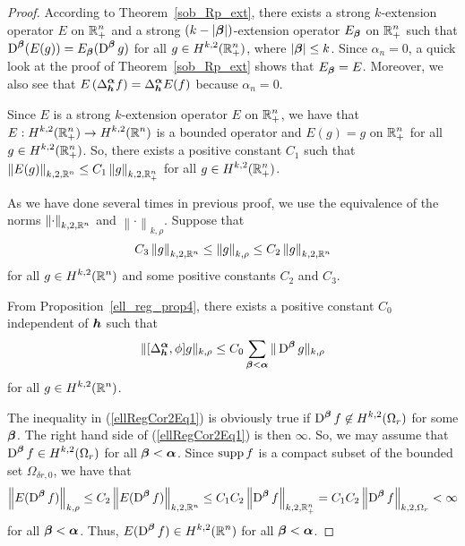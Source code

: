 \begin{proof}
According to Theorem~\ref{sob_Rp_ext}, there exists a strong
$k$-extension operator $E$ on $\displaystyle \mathbb{R}^n_+ $ and a strong
$(k-|{\bm{\beta}}|)$-extension operator $E_{{\bm{\beta}}}$ on
$\displaystyle \mathbb{R}^n_+$ such that
$\displaystyle \operatorname{D}^{{\bm{\beta}}} (E(g)) = E_{{\bm{\beta}}}(\operatorname{D}^{{\bm{\beta}}} g)$
for all $\displaystyle g \in H^{k,2}(\mathbb{R}^n_+)$, where
$|{\bm{\beta}}|\leq k$.  Since $\alpha_n=0$, a quick look at the proof of
Theorem~\ref{sob_Rp_ext} shows that $E_{{\bm{\beta}}} = E$.
Moreover, we also see that 
$\displaystyle E\left( \Delta^{{\bm{\alpha}}}_{{\bm{h}}} f\right) =
\Delta^{{\bm{\alpha}}}_{{\bm{h}}} E(f)$ because $\alpha_n=0$.

Since $E$ is a strong $k$-extension operator $E$ on
$\displaystyle \mathbb{R}^n_+ $, we
have that $\displaystyle E:H^{k,2}(\mathbb{R}^n_+) \to H^{k,2}(\mathbb{R}^n)$ is a
bounded operator and $E(g) = g$ on $\displaystyle \mathbb{R}^n_+$ for all
$\displaystyle g \in H^{k,2}(\mathbb{R}^n_+)$.  So, there exists a
positive constant $C_1$ such that
$\displaystyle \left\| E(g) \right\|_{k,2,\mathbb{R}^n} \leq C_1
\left\| g \right\|_{k,2,\mathbb{R}^n_+}$ for all $\displaystyle g \in H^{k,2}(\mathbb{R}^n_+)$.

As we have done several times in previous proof,
we use the equivalence of the norms
$\displaystyle \left\|\cdot\right\|_{k,2,\mathbb{R}^n}$ and 
$\displaystyle \left\|\cdot\right\|_{k,\rho}$.  Suppose that
\[
C_3 \left\|g \right\|_{k,2,\mathbb{R}^n} \leq \left\|g \right\|_{k,\rho}
\leq C_2 \left\|g \right\|_{k,2,\mathbb{R}^n}
\]
for all $\displaystyle g \in H^{k,2}(\mathbb{R}^n)$ and some positive
constants $C_2$ and $C_3$.

From Proposition~\ref{ell_reg_prop4}, there exists a positive constant $C_0$
independent of ${\bm{h}}$ such that
\[
\| [\Delta^{{\bm{\alpha}}}_{{\bm{h}}}, \phi] g \|_{k,\rho} \leq C_0
\sum_{{\bm{\beta}}<{\bm{\alpha}}} \| \operatorname{D}^{{\bm{\beta}}} g\|_{k,\rho}
\]
for all $\displaystyle g \in H^{k,2}(\mathbb{R}^n)$.

The inequality in (\ref{ellRegCor2Eq1}) is obviously true if
$\displaystyle \operatorname{D}^{{\bm{\beta}}} f \not\in H^{k,2}(\Omega_r)$ for some
${\bm{\beta}}$.  The right hand side of (\ref{ellRegCor2Eq1}) is then
$\infty$.  So, we may assume that
$\displaystyle \operatorname{D}^{{\bm{\beta}}} f \in H^{k,2}(\Omega_r)$ for all
${\bm{\beta}} < {\bm{\alpha}}$.
Since $\operatorname{supp} f$ is a compact subset of the bounded set
$\Omega_{\delta r,0}$,
we have that
\[
\left\|E(\operatorname{D}^{{\bm{\beta}}} f)\right\|_{k,\rho}
\leq C_2 \left\|E(\operatorname{D}^{{\bm{\beta}}} f)\right\|_{k,2,\mathbb{R}^n}
\leq C_1 C_2 \left\|\operatorname{D}^{{\bm{\beta}}} f\right\|_{k,2,\mathbb{R}^n_+}
= C_1 C_2 \left\|\operatorname{D}^{{\bm{\beta}}} f\right\|_{k,2,\Omega_r}
< \infty
\]
for all ${\bm{\beta}} < {\bm{\alpha}}$.  Thus,
$\displaystyle E(\operatorname{D}^{{\bm{\beta}}} f) \in H^{k,2}(\mathbb{R}^n)$
for all ${\bm{\beta}} < {\bm{\alpha}}$.


\end{proof}
